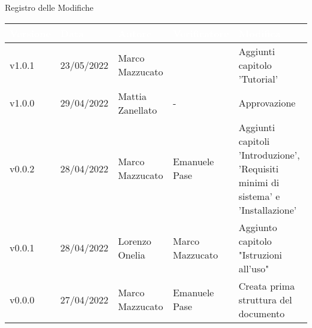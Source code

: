 \begin{center}
  \huge{Registro delle Modifiche}
\end{center}
\renewcommand\arraystretch{1,5}
{\centering
\begin{longtable}{|C{1.8cm}|C{2.1cm}|C{2cm}|C{2.4cm}|L{4.4cm}|}
  \hline
  \textcolor[HTML]{FFFFFF}{\textbf{Versione}} & \textcolor[HTML]{FFFFFF}{\textbf{Data}} & \textcolor[HTML]{FFFFFF}{\textbf{Autore}}  & \textcolor[HTML]{FFFFFF}{\textbf{Verificatore}} & \textcolor[HTML]{FFFFFF}{\textbf{Modifica}}    \\ \hline
  v1.0.1      & 23/05/2022    & Marco Mazzucato   &        & Aggiunti capitolo 'Tutorial'  \\ \hline
  v1.0.0        & 29/04/2022    & Mattia Zanellato    & -    & Approvazione  \\ \hline
  v0.0.2      & 28/04/2022    & Marco Mazzucato   & Emanuele Pase       & Aggiunti capitoli 'Introduzione', 'Requisiti minimi di sistema' e 'Installazione'\\ \hline
  v0.0.1        & 28/04/2022    & Lorenzo Onelia    & Marco Mazzucato       & Aggiunto capitolo "Istruzioni all'uso" \\ \hline
  v0.0.0        & 27/04/2022    & Marco Mazzucato   &  Emanuele Pase     & Creata prima struttura del documento \\ \hline
\end{longtable}}

\renewcommand\arraystretch{1}
